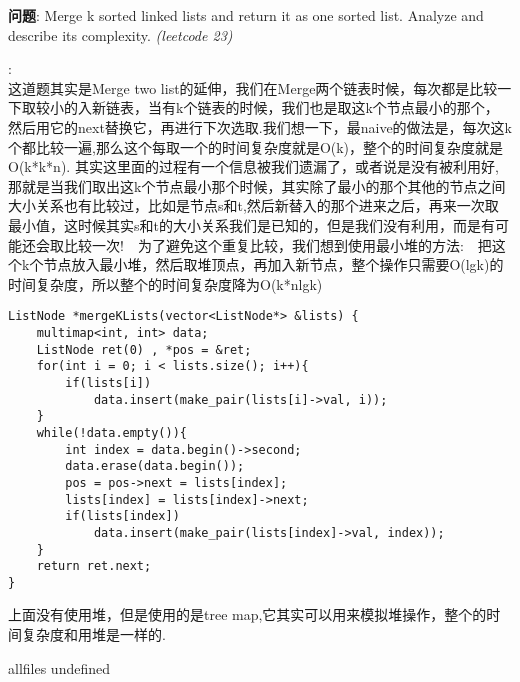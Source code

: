 \documentclass{article}
\begin{document}
\begin{CJK}{UTF8}{gbsn}     %

\else
    
\begin{description}
    \item{\textbf{问题}}: Merge k sorted linked lists and return it as one sorted list. Analyze and describe its complexity. \textit{(leetcode 23)}
    \item{\textbf{}} : 
    \\这道题其实是Merge two list的延伸，我们在Merge两个链表时候，每次都是比较一下取较小的入新链表，当有k个链表的时候，我们也是取这k个节点最小的那个，然后用它的next替换它，再进行下次选取.我们想一下，最naive的做法是，每次这k个都比较一遍,那么这个每取一个的时间复杂度就是O(k)，整个的时间复杂度就是O(k*k*n). 其实这里面的过程有一个信息被我们遗漏了，或者说是没有被利用好,那就是当我们取出这k个节点最小那个时候，其实除了最小的那个其他的节点之间大小关系也有比较过，比如是节点s和t,然后新替入的那个进来之后，再来一次取最小值，这时候其实s和t的大小关系我们是已知的，但是我们没有利用，而是有可能还会取比较一次!　为了避免这个重复比较，我们想到使用最小堆的方法:　把这个k个节点放入最小堆，然后取堆顶点，再加入新节点，整个操作只需要O(lgk)的时间复杂度，所以整个的时间复杂度降为O(k*nlgk)
    \begin{lstlisting}
ListNode *mergeKLists(vector<ListNode*> &lists) {
	multimap<int, int> data;
	ListNode ret(0) , *pos = &ret;
	for(int i = 0; i < lists.size(); i++){
		if(lists[i])
			data.insert(make_pair(lists[i]->val, i));
	}
	while(!data.empty()){
		int index = data.begin()->second;
		data.erase(data.begin());
		pos = pos->next = lists[index];
		lists[index] = lists[index]->next;
		if(lists[index])
			data.insert(make_pair(lists[index]->val, index));
	}
	return ret.next;
}
    \end{lstlisting}
	上面没有使用堆，但是使用的是tree map,它其实可以用来模拟堆操作，整个的时间复杂度和用堆是一样的.
\end{description}

\fi

\ifx allfiles undefined
\end{CJK}
\end{document}
